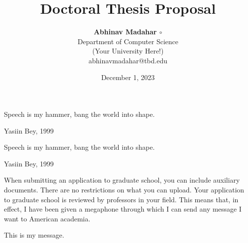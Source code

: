 \documentclass[12pt]{article}
\title{{\bf Doctoral Thesis Proposal}}
\author{ {\bf Abhinav Madahar $\circ$ {\normalfont {\devanagari अभिनव मदहर}}}  \\
Department of Computer Science \\
(Your University Here!) \\
{\small abhinavmadahar@tbd.edu}}
\date{December 1, 2023}
\begin{document}
\pagestyle{plain}
\maketitle

\pagebreak
\vspace*{\fill}
\noindent Speech is my hammer, bang the world into shape.

\noindent Yasiin Bey, 1999
\vspace*{\fill}

\pagebreak
\vspace*{\fill}
\noindent Speech is my hammer, bang the world into shape.

\noindent Yasiin Bey, 1999
\vspace*{\fill}

\pagebreak
\vspace*{\fill}
\noindent
When submitting an application to graduate school, you can include auxiliary documents.
There are no restrictions on what you can upload.
Your application to graduate school is reviewed by professors in your field.
This means that, in effect, I have been given a megaphone through which I can send any message I want to American academia.

\vspace{1cm}

\noindent
This is my message.

\vspace*{\fill}

\pagebreak
\begin{abstract}

\end{abstract}

\pagebreak
\tableofcontents
\pagebreak

\cleardoublepage
{}


\begin{footnotesize}


\end{footnotesize}
\end{document}
